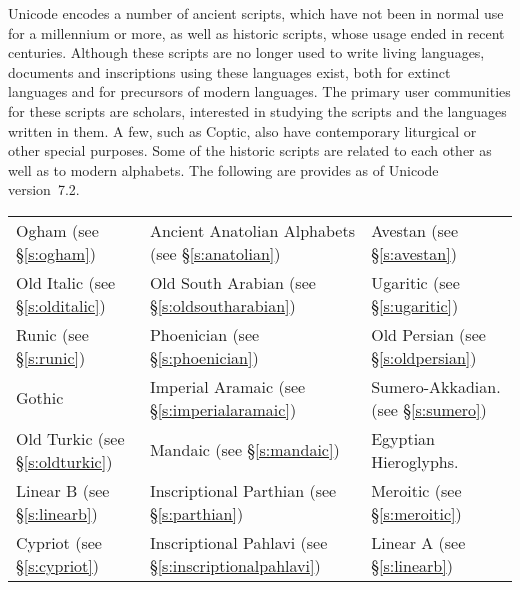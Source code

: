Unicode encodes a number of ancient scripts, which have not been in normal use for a millennium or more, as well as historic scripts, whose usage ended in recent centuries. Although these scripts are no longer used to write living languages, documents and inscriptions using these languages exist, both for extinct languages and for precursors of modern languages. The primary user communities for these scripts are scholars, interested in studying the scripts and the languages written in them. A few, such as Coptic, also have contemporary liturgical or other special purposes. Some of the historic scripts are related to each other as well as to modern alphabets. The following are provides as of Unicode version~7.2.
\begin{center}
\begin{tabular}{lll}
Ogham (see \S\ref{s:ogham})           
&Ancient Anatolian Alphabets (see \S\ref{s:anatolian})
&Avestan (see \S\ref{s:avestan})\\
Old Italic (see \S\ref{s:olditalic})       
&Old South Arabian (see \S\ref{s:oldsoutharabian})          
&Ugaritic (see \S\ref{s:ugaritic})\\
Runic (see \S\ref{s:runic})            
&Phoenician (see \S\ref{s:phoenician})                  
&Old Persian (see \S\ref{s:oldpersian})\\
Gothic            
&Imperial Aramaic (see \S\ref{s:imperialaramaic})            
&Sumero-Akkadian. (see \S\ref{s:sumero})\\
Old Turkic (see \S\ref{s:oldturkic})     
&Mandaic (see \S\ref{s:mandaic}) 
&Egyptian Hieroglyphs.\\
Linear B (see \S\ref{s:linearb})          
&Inscriptional Parthian (see \S\ref{s:parthian})      
&Meroitic (see \S\ref{s:meroitic})\\
Cypriot (see \S\ref{s:cypriot})
&Inscriptional Pahlavi  (see \S\ref{s:inscriptionalpahlavi})       
&Linear A (see \S\ref{s:linearb})\\
\end{tabular}
\end{center}

